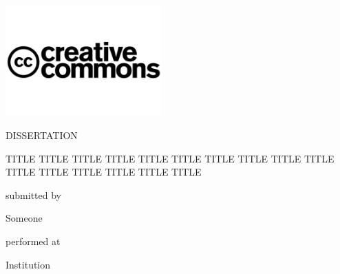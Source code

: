 \begin{titlepage}		%
\pagestyle{empty}

\enlargethispage{2.5cm}		%
\centering %

\vspace*{-2cm}
\begin{minipage}{\textwidth}
	\centering
	\includegraphics[trim={0cm 6cm 0 5cm}, clip, width=0.45\textwidth]{creativecommons.png}
\end{minipage}
\vspace*{2cm}

{\LARGE DISSERTATION}\vfill

\begin{onehalfspace}
\Large
TITLE TITLE TITLE TITLE TITLE TITLE TITLE TITLE TITLE TITLE TITLE TITLE TITLE TITLE TITLE TITLE 
\end{onehalfspace}\vfill%


\normalsize submitted by
\vfill

\LARGE%
Someone
\vfill

\normalsize performed at
\vfill%

\Large Institution
\vfill


\end{titlepage}

